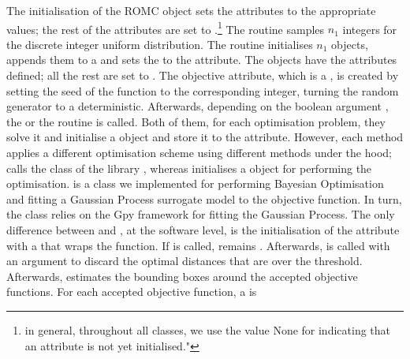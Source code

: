 The initialisation of the ROMC object sets the attributes
 to the
appropriate values; the rest of the attributes are set to
.\footnote{in general, throughout all classes, we use
  the value None for indicating that an attribute is not yet
  initialised."} The  routine samples
$n_1$ integers for the discrete integer uniform distribution. The
 routine initialises $n_1$
 objects, appends them to a
 and sets the  to the
 attribute. The
 objects have the attributes
 defined; all the rest are set to
. The objective attribute, which is a
, is created by setting the seed of the
 function to the corresponding integer,
turning the random generator to a deterministic. Afterwards, depending
on the boolean argument , the
 or the  routine is
called. Both of them, for each optimisation problem, they solve it and
initialise a  object and store it to
the  attribute. However, each
method applies a different optimisation scheme using different methods
under the hood;  calls the
 class of the  library
\autocite{2020SciPy-NMeth}, whereas  initialises a
 object for performing the
optimisation. is a class we implemented for
performing Bayesian Optimisation and fitting a Gaussian Process
surrogate model to the objective function. In turn, the
 class relies on the Gpy framework
\autocite{gpy2014} for fitting the Gaussian Process. The only
difference between  and ,
at the software level, is the initialisation of the
 attribute with a
 that wraps the 
function. If  is called, remains
. Afterwards,  is called with
an argument  to discard the optimal distances that
are over the threshold. Afterwards,  estimates
the bounding boxes around the accepted objective functions. For each
accepted objective function, a  is
